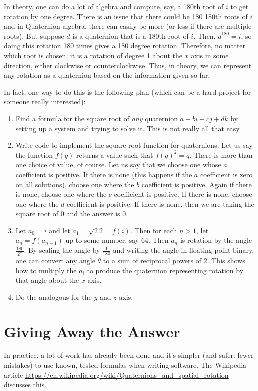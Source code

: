 \documentclass[letter,12pt]{article}
\begin{document}
In theory, one can do a lot of algebra and compute, say, a 180th root of $i$ to get rotation by one degree.   There is an issue that there could be 180 180th roots of $i$ and in Quaternion algebra, there can easily be more (or less if there are multiple roots).  But suppose $d$ is a quaternion that is a 180th root of $i$.  Then, $d^{180}=i$, so doing this rotation 180 times gives a 180 degree rotation.  Therefore, no matter which root is chosen, it is a rotation of degree 1 about the $x$ axis in some direction, either clockwise or counterclockwise.  Thus, in theory, we can represent any rotation as a quaternion based on the information given so far.

In fact, one way to do this is the following plan (which can be a hard project for someone really interested):

\begin{enumerate}
\item Find a formula for the square root of \emph{any} quaternion $a+bi+cj+dk$ by setting up a system and trying to solve it.  This is not really all that easy.
\item Write code to implement the square root function for quaternions.  Let us say the function $f(q)$ returns a value such that $f(q)^2=q$.  There is more than one choice of value, of course.  Let us say that we choose one whose $a$ coefficient is positive.  If there is none (this happens if the $a$ coefficient is zero on all solutions), choose one where the $b$ coefficient is positive.  Again if there is none, choose one where the $c$ coefficient is positive.  If there is none, choose one where the $d$ coefficient is positive.  If there is none, then we are taking the square root of 0 and the answer is 0.
\item Let $a_0=i$ and let $a_1=\sqrt{2}2=f(i)$.  Then for each $n>1$, let $a_n=f(a_{n-1})$ up to some number, say 64.  Then $a_n$ is rotation by the angle $\frac{180}{2^n}$.  By scaling the angle by $\frac{1}{180}$ and writing the angle in floating point binary, one can convert any angle $\theta$ to a sum of reciprocal powers of 2.  This shows how to multiply the $a_i$ to produce the quaternion representing rotation by that angle about the $x$ axis.
\item Do the analogous for the $y$ and $z$ axis.
\end{enumerate}

\section{Giving Away the Answer}
In practice, a lot of work has already been done and it’s simpler (and safer: fewer mistakes) to use known, tested formulas when writing software.  The Wikipedia article \url{https://en.wikipedia.org/wiki/Quaternions_and_spatial_rotation} discusses this.
\end{document}
